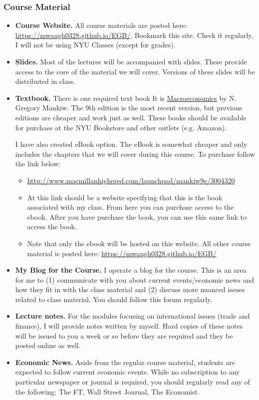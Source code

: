 \documentclass[12pt,pdftex,twoside,letterpaper]{exam}
\begin{document}
\subsubsection*{Course Material}
\begin{itemize}
\item \textbf{Course Website.} All course materials are posted here:
 \url{https://mwaugh0328.github.io/EGB/}. Bookmark this site. Check it regularly.
 I will not be using NYU Classes (except for grades).


\item \textbf{Slides.}
Most of the lectures will be accompanied with slides. These provide access to the core of the material we will cover. Versions of these slides will be distributed in class.

\item \textbf{Textbook.}
There is one required text book It is \href{https://www.amazon.com/Macroeconomics-N-Gregory-Mankiw/dp/1464182892}{Macroeconomics} by N. Gregory Mankiw. The 9th edition is the most recent version, but previous editions are cheaper and work just as well. These books should be available for purchase at the NYU Bookstore and other outlets (e.g. Amazon).

I have also created eBook option. The eBook is somewhat cheaper and only includes the chapters that we will cover during this course. To purchase follow the link below:
\begin{itemize}
\item \url{http://www.macmillanhighered.com/launchpad/mankiw9e/3004320}
\item At this link should be a website specifying that this is the book associated with my class. From here you can purchase access to the ebook. After you have purchase the book, you can use this same link to access the book.

\item Note that only the ebook will be hosted on this website. All other course material is posted here:
 \url{https://mwaugh0328.github.io/EGB/}
\end{itemize}

\item \textbf{My Blog for the Course.} I operate a blog for the course. This is an area for me to (1) communicate with you about current events/economic news and how they fit in with the class material and (2) discuss more nuanced issues related to class material. You should follow this forum regularly.

\item \textbf{Lecture notes.}
For the modules focusing on international issues (trade and finance), I will provide notes written by myself. Hard copies of these notes will be issued to you a week or so before they are required and they be posted online as well.

\item \textbf{Economic News.}
Aside from the regular course material, students are expected to follow current economic events. While no subscription to any particular newspaper or journal is required, you should regularly read any of the following: The FT, Wall Street Journal, The Economist.
\end{itemize}
\end{document}
